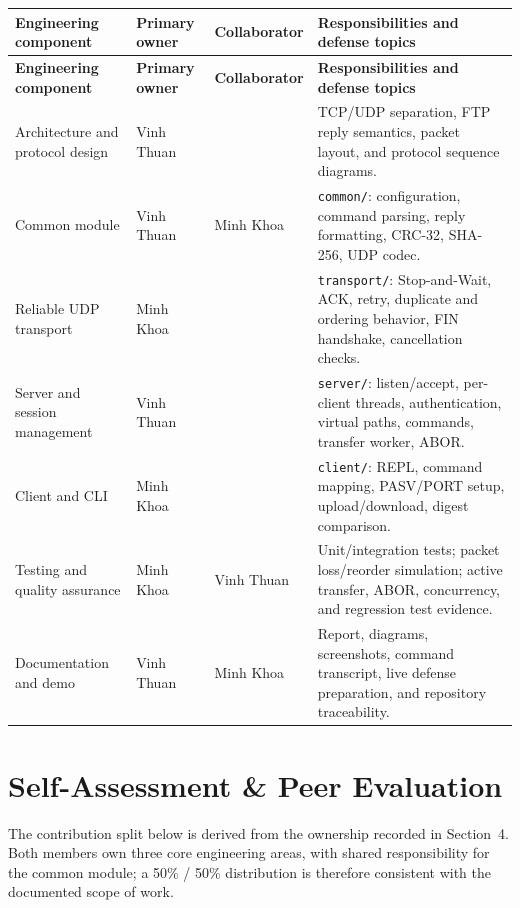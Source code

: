 \documentclass[11pt,a4paper]{article}
\newcommand{\code}[1]{\texttt{#1}}
\begin{document}
\begin{longtable}{@{}P{23mm}P{25mm}P{25mm}P{74mm}@{}}
\toprule
\textbf{Engineering component} & \textbf{Primary owner} & \textbf{Collaborator} & \textbf{Responsibilities and defense topics} \\
\midrule
\endfirsthead
\toprule
\textbf{Engineering component} & \textbf{Primary owner} & \textbf{Collaborator} & \textbf{Responsibilities and defense topics} \\
\midrule
\endhead
Architecture and protocol design & Vinh Thuan &  & TCP/UDP separation, FTP reply semantics, packet layout, and protocol sequence diagrams. \\
Common module & Vinh Thuan & Minh Khoa & \code{common/}: configuration, command parsing, reply formatting, CRC-32, SHA-256, UDP codec. \\
Reliable UDP transport & Minh Khoa &  & \code{transport/}: Stop-and-Wait, ACK, retry, duplicate and ordering behavior, FIN handshake, cancellation checks. \\
Server and session management & Vinh Thuan &  & \code{server/}: listen/accept, per-client threads, authentication, virtual paths, commands, transfer worker, ABOR. \\
Client and CLI & Minh Khoa &  & \code{client/}: REPL, command mapping, PASV/PORT setup, upload/download, digest comparison. \\
Testing and quality assurance & Minh Khoa & Vinh Thuan & Unit/integration tests; packet loss/reorder simulation; active transfer, ABOR, concurrency, and regression test evidence. \\
Documentation and demo & Vinh Thuan & Minh Khoa & Report, diagrams, screenshots, command transcript, live defense preparation, and repository traceability. \\
\bottomrule
\end{longtable}

\section{Self-Assessment \& Peer Evaluation}

The contribution split below is derived from the ownership recorded in Section~4. Both members own three core engineering areas, with shared responsibility for the common module; a 50\% / 50\% distribution is therefore consistent with the documented scope of work.
\end{document}
